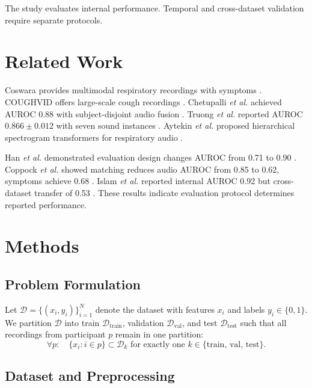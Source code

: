\documentclass[conference]{IEEEtran}
\begin{document}
The study evaluates internal performance. Temporal and cross-dataset validation require separate protocols.

\section{Related Work}

Coswara provides multimodal respiratory recordings with symptoms \cite{bhattacharya2023coswara}. COUGHVID offers large-scale cough recordings \cite{orlandic2021coughvid}. Chetupalli \emph{et al.} achieved AUROC 0.88 with subject-disjoint audio fusion \cite{chetupalli2023multimodal}. Truong \emph{et al.} reported AUROC $0.866\pm0.012$ with seven sound instances \cite{truong2024fair}. Aytekin \emph{et al.} proposed hierarchical spectrogram transformers for respiratory audio \cite{aytekin2024hst}.

Han \emph{et al.} demonstrated evaluation design changes AUROC from 0.71 to 0.90 \cite{han2022realistic}. Coppock \emph{et al.} showed matching reduces audio AUROC from 0.85 to 0.62, symptoms achieve 0.68 \cite{coppock2024audio}. Islam \emph{et al.} reported internal AUROC 0.92 but cross-dataset transfer of 0.53 \cite{islam2026robust}. These results indicate evaluation protocol determines reported performance.

\section{Methods}

\subsection{Problem Formulation}

Let $\mathcal{D} = \{(x_i, y_i)\}_{i=1}^N$ denote the dataset with features $x_i$ and labels $y_i \in \{0, 1\}$. We partition $\mathcal{D}$ into train $\mathcal{D}_{\text{train}}$, validation $\mathcal{D}_{\text{val}}$, and test $\mathcal{D}_{\text{test}}$ such that all recordings from participant $p$ remain in one partition:
\begin{equation}
\forall p: \quad \{x_i : i \in p\} \subset \mathcal{D}_k \text{ for exactly one } k \in \{\text{train, val, test}\}.
\end{equation}

\subsection{Dataset and Preprocessing}
\end{document}
